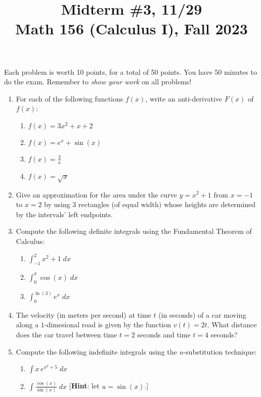 \documentclass[11pt]{article}
\title{Midterm \#3, 11/29 \\ Math 156 (Calculus I), Fall 2023}
\date{}
\begin{document}
\maketitle

\thispagestyle{empty}

\vspace{-1cm}

Each problem is worth 10 points, for a total of 50 points. You have 50 minutes to do the exam. Remember to \emph{show your work} on all problems!

\begin{enumerate}
\item For each of the following functions $f(x)$, write an anti-derivative $F(x)$ of $f(x)$:
\begin{enumerate}
\item $f(x)=3x^2+x+2$
\item $f(x) = e^x + \sin(x)$
\item $f(x) = \frac{3}{x}$
\item $f(x) = \sqrt{x}$
\end{enumerate}
\item Give an approximation for the area under the curve $y=x^2+1$ from $x=-1$ to $x=2$ by using $3$ rectangles (of equal width) whose heights are determined by the intervals' left endpoints.
\item Compute the following definite integrals using the Fundamental Theorem of Calculus:
\begin{enumerate}
\item $\displaystyle \int_{-1}^{2} x^2+1 \; dx$
\item $\displaystyle \int_{0}^{\pi} \cos(x) \; dx$
\item $\displaystyle \int_{0}^{\ln(3)} e^x \; dx$
\end{enumerate}
\item The velocity (in meters per second) at time $t$ (in seconds) of a car moving along a $1$-dimesional road is given by the function $v(t)=2t$. What distance does the car travel between time $t=2$ seconds and time $t=4$ seconds?
\item Compute the following indefinite integrals using the $u$-substitution technique:
\begin{enumerate}
\item $\displaystyle \int x \, e^{x^2+5} \; dx$
\item $\displaystyle \int \frac{\cos(x)}{\sin(x)} \; dx$ \hfill [{\bf Hint}: let $u=\sin(x)$.]
\end{enumerate}
\end{enumerate}
\end{document}
